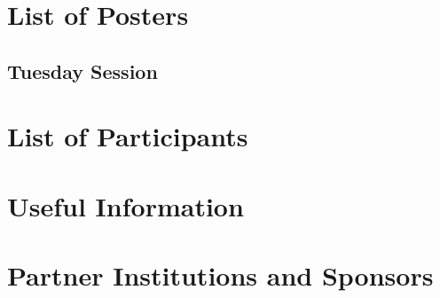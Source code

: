 \documentclass[openany, parskip=full, 12pt, a4]{scrbook}
\begin{document}




%
%
%
%
%
%


%

\chapter{List of Posters} 

\vspace{-2.5em}

\section{Tuesday Session}

%
%
%
%
%
%
%
%


\chapter{List of Participants}
 

 
\chapter{Useful Information}



\chapter{Partner Institutions and Sponsors}



\newpage


\pagecolor{myblue}
\thispagestyle{empty}
\mbox{}
\end{document}
